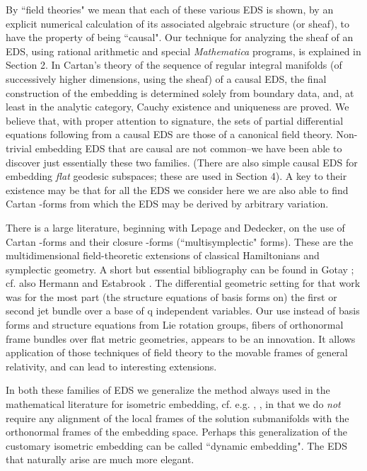 \documentclass[a4paper,a4paper]{article}
\begin{document}
        By ``field theories" we mean that each of these various EDS is
shown,  by an explicit numerical calculation of its associated algebraic
structure (or sheaf),  to have the property of being ``causal".  Our technique for
analyzing the sheaf of an EDS,  using rational arithmetic and special
{\itshape Mathematica} programs,  is explained in Section 2.  In Cartan's theory of the
sequence of regular integral manifolds (of successively higher
dimensions,  using the sheaf) of a causal EDS,  the final construction of the embedding is
determined solely from boundary data,  and,  at least in the analytic
category, Cauchy existence and uniqueness are proved.  We believe that,  with
proper attention to signature,  the sets of partial differential
equations following from a causal EDS are those of a canonical field theory.  Non-trivial
embedding EDS that are causal are not common--we have been able to
discover just essentially these two families.  (There are also simple causal EDS
for embedding {\itshape flat} geodesic subspaces;  these are used in
Section 4).  A key to their existence may be that for all the EDS we consider
here we are also able to find Cartan \coordHE{}-forms from which the EDS may be
derived by arbitrary variation.

        There is a large literature,  beginning with Lepage and
Dedecker,  on the use of Cartan \coordHE{}-forms and their closure \coordHE{}-forms
(``multisymplectic" forms).  These are the multidimensional field-theoretic extensions of
classical Hamiltonians and symplectic geometry.  A short but essential
bibliography can be found in Gotay \cite{got91};  cf. also Hermann \cite{her88} and
Estabrook \cite{est80}.  The differential geometric setting for that
work was for the most part (the structure equations of basis forms on) the first or second jet bundle
over a base of q independent variables.  Our use instead of basis forms
and structure equations from Lie rotation groups,  fibers of orthonormal
frame bundles over flat metric geometries,  appears to be an
innovation.  It allows application of those techniques of field theory to the movable frames of
general relativity,  and can lead to interesting extensions.

        In both these families of EDS we  generalize the method always
used in the mathematical literature for isometric embedding,  cf. e.g.
\cite{bry83},  \cite{gri87}, in that we do {\itshape not} require any alignment of the local frames
of the solution submanifolds with the orthonormal frames of the
embedding space.  Perhaps this generalization of the customary isometric
embedding  can be called ``dynamic embedding".  The EDS that naturally
arise are much more elegant.
\end{document}

